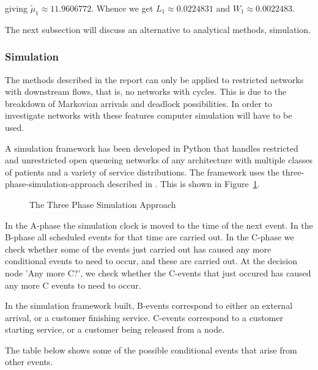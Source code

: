 \documentclass{article}
\begin{document}
giving $\tilde{\mu}_1 \approx 11.9606772$.
Whence we get $L_1 \approx 0.0224831$ and $W_1 \approx 0.0022483$.

The next subsection will discuss an alternative to analytical methods, simulation.

\subsubsection{Simulation}
The methods described in the report can only be applied to restricted networks with downstream flows, that is, no networks with cycles.
This is due to the breakdown of Markovian arrivals and deadlock possibilities.
In order to investigate networks with these features computer simulation will have to be used.

A simulation framework has been developed in Python that handles restricted and unrestricted open queueing networks of any architecture with multiple classes of patients and a variety of service distributions.
The framework uses the three-phase-simulation-approach described in \cite{robinson07}.
This is shown in Figure~\ref{fig:3phase}.

\begin{figure}[H]
    \begin{center}
    
    \caption{The Three Phase Simulation Approach \cite{robinson07}}
    \label{fig:3phase}
    \end{center}
\end{figure}

In the A-phase the simulation clock is moved to the time of the next event.
In the B-phase all scheduled events for that time are carried out.
In the C-phase we check whether some of the events just carried out has caused any more conditional events to need to occur, and these are carried out.
At the decision node 'Any more C?', we check whether the C-events that just occured has caused any more C events to need to occur.

In the simulation framework built, B-events correspond to either an external arrival, or a customer finishing service.
C-events correspond to a customer starting service, or a customer being released from a node.

The table below shows some of the possible conditional events that arise from other events.
\end{document}
